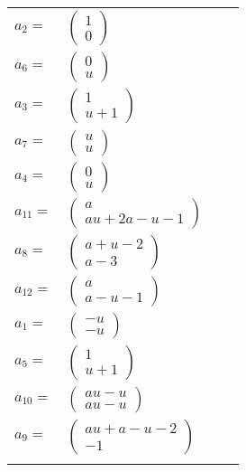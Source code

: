 \documentclass[1p]{elsarticle_modified}
\theoremstyle{definition}
\begin{document}
\begin{tabular}{m{7pt} m{180pt} m{7pt} m{180pt} }
\flushright $a_{2}=$&$\begin{pmatrix}1\\0\end{pmatrix}$ \\
\flushright $a_{6}=$&$\begin{pmatrix}0\\u\end{pmatrix}$ \\
\flushright $a_{3}=$&$\begin{pmatrix}1\\u+1\end{pmatrix}$ \\
\flushright $a_{7}=$&$\begin{pmatrix}u\\u\end{pmatrix}$ \\
\flushright $a_{4}=$&$\begin{pmatrix}0\\u\end{pmatrix}$ \\
\flushright $a_{11}=$&$\begin{pmatrix}a\\a u+2 a- u-1\end{pmatrix}$ \\
\flushright $a_{8}=$&$\begin{pmatrix}a+u-2\\a-3\end{pmatrix}$ \\
\flushright $a_{12}=$&$\begin{pmatrix}a\\a- u-1\end{pmatrix}$ \\
\flushright $a_{1}=$&$\begin{pmatrix}- u\\- u\end{pmatrix}$ \\
\flushright $a_{5}=$&$\begin{pmatrix}1\\u+1\end{pmatrix}$ \\
\flushright $a_{10}=$&$\begin{pmatrix}a u- u\\a u- u\end{pmatrix}$ \\
\flushright $a_{9}=$&$\begin{pmatrix}a u+a- u-2\\-1\end{pmatrix}$\\&\end{tabular}
\end{document}
